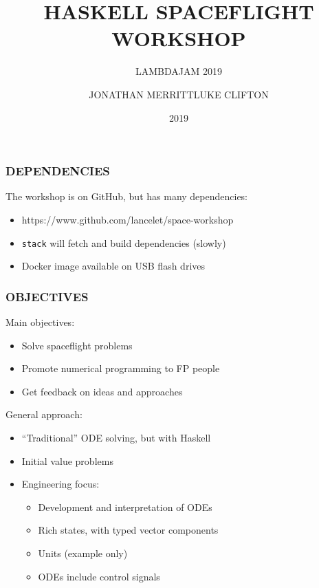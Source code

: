 \documentclass{beamer}
\begin{document}
\title{HASKELL SPACEFLIGHT WORKSHOP}
\author{JONATHAN MERRITT\hspace{0.5em}{\scriptsize\&}\hspace{0.5em}LUKE CLIFTON}
\subtitle{LAMBDAJAM 2019}
\date{2019}

\begin{frame}
  \titlepage
\end{frame}

\begin{frame}
  \frametitle{DEPENDENCIES}
  The workshop is on GitHub, but has many dependencies:
  \begin{itemize}
    \item https://www.github.com/lancelet/space-workshop
    \item \texttt{stack} will fetch and build dependencies (slowly)
    \item Docker image available on USB flash drives
  \end{itemize}
\end{frame}

\begin{frame}
  \frametitle{OBJECTIVES}
  Main objectives:
  \begin{itemize}
    \item Solve spaceflight problems
    \item Promote numerical programming to FP people
    \item Get feedback on ideas and approaches
  \end{itemize}
  \vspace{1em}
  General approach:
  \begin{itemize}
    \item ``Traditional'' ODE solving, but with Haskell
    \item Initial value problems
    \item Engineering focus:
      \begin{itemize}
        \item Development and interpretation of ODEs
        \item Rich states, with typed vector components
        \item Units (example only) 
        \item ODEs include control signals
      \end{itemize}
  \end{itemize}
\end{frame}
\end{document}
